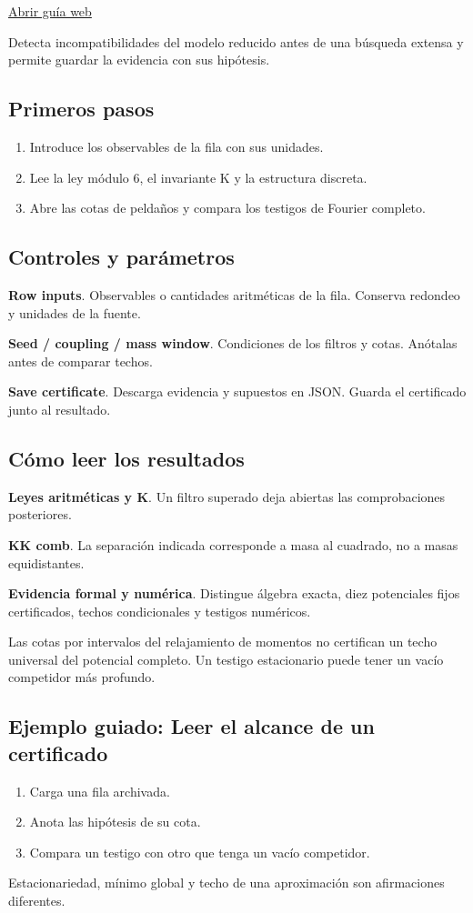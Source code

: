 \documentclass[11pt,a4paper]{article}
\begin{document}
\href{https://karlesmarin.github.io/ghu-explorer/guide/es/screen/index.html}{Abrir guía web}

Detecta incompatibilidades del modelo reducido antes de una búsqueda extensa y permite guardar la evidencia con sus hipótesis.
\subsection*{Primeros pasos}
\begin{enumerate}
\item Introduce los observables de la fila con sus unidades.
\item Lee la ley módulo 6, el invariante K y la estructura discreta.
\item Abre las cotas de peldaños y compara los testigos de Fourier completo.
\end{enumerate}
\subsection*{Controles y parámetros}
\textbf{Row inputs}. Observables o cantidades aritméticas de la fila. Conserva redondeo y unidades de la fuente.

\textbf{Seed / coupling / mass window}. Condiciones de los filtros y cotas. Anótalas antes de comparar techos.

\textbf{Save certificate}. Descarga evidencia y supuestos en JSON. Guarda el certificado junto al resultado.

\subsection*{Cómo leer los resultados}
\textbf{Leyes aritméticas y K}. Un filtro superado deja abiertas las comprobaciones posteriores.

\textbf{KK comb}. La separación indicada corresponde a masa al cuadrado, no a masas equidistantes.

\textbf{Evidencia formal y numérica}. Distingue álgebra exacta, diez potenciales fijos certificados, techos condicionales y testigos numéricos.

Las cotas por intervalos del relajamiento de momentos no certifican un techo universal del potencial completo. Un testigo estacionario puede tener un vacío competidor más profundo.
\subsection*{Ejemplo guiado: Leer el alcance de un certificado}
\begin{enumerate}
\item Carga una fila archivada.
\item Anota las hipótesis de su cota.
\item Compara un testigo con otro que tenga un vacío competidor.
\end{enumerate}
Estacionariedad, mínimo global y techo de una aproximación son afirmaciones diferentes.
\end{document}
